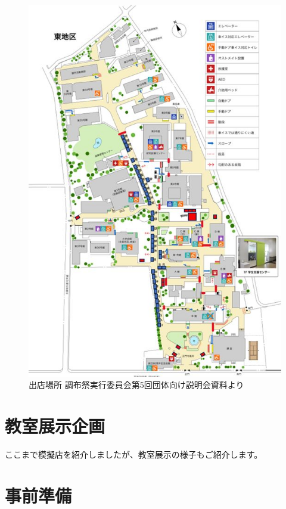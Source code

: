 \documentclass[../super_nova_20yy]{subfiles}
\begin{document}
\begin{figure}[H]
  \centering
  \includegraphics[width=\columnwidth]{画像5.jpg}
  \caption{出店場所 調布祭実行委員会第5回団体向け説明会資料より}
  \label{fig:5}
\end{figure}

\section{教室展示企画}

ここまで模擬店を紹介しましたが、教室展示の様子もご紹介します。

\section{事前準備}
\end{document}
